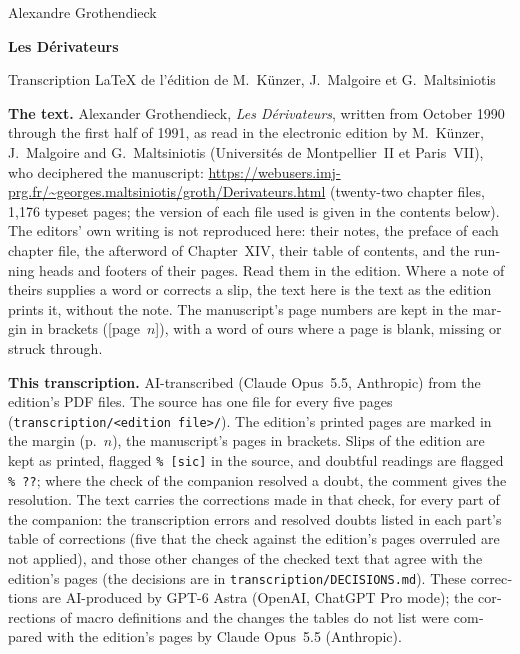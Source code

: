 \documentclass[11pt,oneside]{article}
\DeclareRobustCommand{\[}{\begingroup\global\DERtaggedfalse\gdef\DERtagbody{}%
  \let\tag\DERtag\let\split\aligned\let\endsplit\endaligned\global\setbox\DERdispbox\hbox\bgroup$\displaystyle}
\DeclareRobustCommand{\]}{$\egroup\endgroup\DERshowdisplay}
\begin{document}
\pagestyle{plain}
\begin{titlepage}
\centering
\vspace*{0.22\textheight}
{\Large Alexandre Grothendieck\par}
\vspace{2em}
{\Huge\bfseries Les Dérivateurs\par}
\vspace{2em}
{\large Transcription \LaTeX{} de l'édition de M.~Künzer, J.~Malgoire et G.~Maltsiniotis\par}
\vfill
\end{titlepage}
\begin{otherlanguage}{english}
\noindent\textbf{The text.} Alexander Grothendieck, \emph{Les Dérivateurs}, written from October 1990 through the
first half of 1991, as read in the electronic edition by M.~Künzer, J.~Malgoire and G.~Maltsiniotis (Universités de
Montpellier~II et Paris~VII), who deciphered the manuscript: \url{https://webusers.imj-prg.fr/~georges.maltsiniotis/groth/Derivateurs.html} (twenty-two chapter files,
1,176 typeset pages; the version of each file used is given in the contents below). The editors' own writing is not
reproduced here: their notes, the preface of each chapter file, the afterword of Chapter~XIV, their table of contents,
and the running heads and footers of their pages. Read them in the edition. Where a note of theirs supplies a word or
corrects a slip, the text here is the text as the edition prints it, without the note. The manuscript's page numbers
are kept in the margin in brackets ([page~$n$]), with a word of ours where a page is blank, missing or struck through.

\medskip
\noindent\textbf{This transcription.} AI-transcribed (Claude Opus~5.5, Anthropic) from the edition's PDF files. The
source has one file for every five pages (\texttt{transcription/<edition file>/}). The edition's printed pages are
marked in the margin (p.~$n$), the manuscript's pages in brackets. Slips of the edition are kept as printed, flagged
\texttt{\%~[sic]} in the source, and
doubtful readings are flagged \texttt{\%~??}; where the check of the companion resolved a doubt, the comment gives the
resolution. The text carries the corrections made in that check, for every part of the companion: the
transcription errors and resolved doubts listed in each part's table of corrections (five that the check against
the edition's pages overruled are not applied), and those other changes of the checked text that agree with the
edition's pages (the decisions are in \texttt{transcription/DECISIONS.md}).
These corrections are AI-produced by GPT-6 Astra (OpenAI, ChatGPT Pro mode); the corrections of macro definitions
and the changes the tables do not list were compared with the edition's pages by Claude Opus~5.5 (Anthropic).


\end{otherlanguage}
\end{document}

